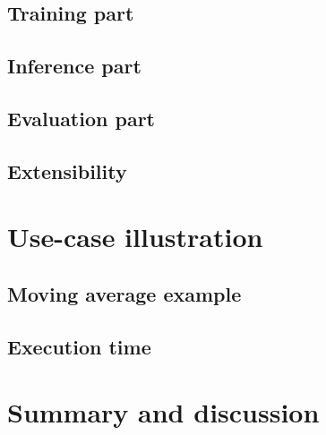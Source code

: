 \documentclass[article]{jss}
\begin{document}
\subsection{Training part} 
\label{subsec:training}


\subsection{Inference part} 
\label{subsec:inference}



\subsection{Evaluation part} 
\label{subsec:evaluation}


\subsection{Extensibility} %
\label{subsec:extensibility}


\section{Use-case illustration}
\subsection{Moving average example}


\subsection{Execution time}



\section{Summary and discussion} \label{sec:summary}


\end{document}
